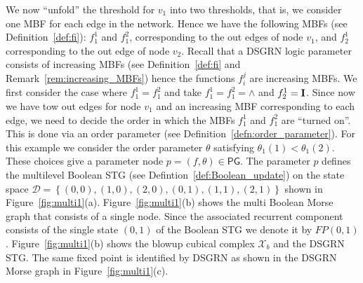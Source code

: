 \documentclass[12pt, notitlepage]{amsart}
\newcommand{\setof}[1]{\left\{ {#1}\right\}}
\newcommand{\cD}{\mathcal{D}}
\newcommand{\cX}{{\mathcal X}}
\theoremstyle{definition}
\newcommand{\PG}{\mathsf{PG}}
\begin{document}
We now ``unfold'' the threshold for $v_1$ into two thresholds, that is, we consider one MBF for each edge in the network. Hence we have the following MBFs (see Definition~\ref{def:fi}): $f_1^1$ and $f_1^2$, corresponding to the out edges of node $v_1$, and $f_2^1$ corresponding to the out edge of node $v_2$. Recall that a DSGRN logic parameter consists of increasing MBFs (see Definition~\ref{def:fi} and Remark~\ref{rem:increasing_MBFs}) hence the functions $f_i^j$ are increasing MBFs. We first consider the case where $f_1^1 = f_1^2$ and take $f_1^1 = f_1^2 = \wedge$ and $f_2^1 = {\bf I}$. Since now we have tow out edges for node $v_1$ and an increasing MBF corresponding to each edge, we need to decide the order in which the MBFs $f_1^1$ and $f_1^2$ are ``turned on''. This is done via an order parameter (see Definition~\ref{defn:order_parameter}). For this example we consider the order parameter $\theta$ satisfying $\theta_1(1) < \theta_1(2)$. These choices give a parameter node $p = (f, \theta) \in \PG$. The parameter $p$ defines the multilevel Boolean STG (see Defintion~\ref{def:Boolean_update}) on the state space $\cD = \setof{(0,0),(1,0),(2,0), (0,1), (1,1), (2,1)}$ shown in Figure~\ref{fig:multi1}(a). Figure~\ref{fig:multi1}(b) shows the multi Boolean Morse graph that consists of a single node. Since the associated recurrent component consists of the single state $(0, 1)$ of the Boolean STG we denote it by $FP(0,1)$. Figure~\ref{fig:multi1}(b) shows the blowup cubical complex $\cX_b$ and the DSGRN STG. The same fixed point is identified by DSGRN as shown in the DSGRN Morse graph in Figure~\ref{fig:multi1}(c).
\end{document}
